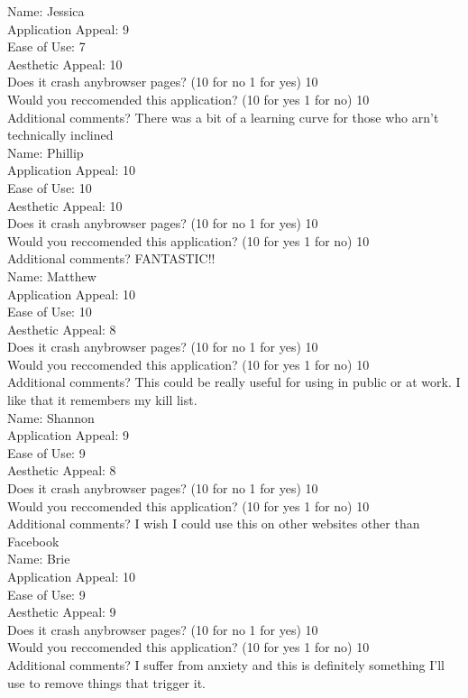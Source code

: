 \documentclass[12pt, titlepage]{article}
\begin{document}
Name: Jessica\\
Application Appeal: 9 \\ 
Ease of Use: 7\\ 
Aesthetic Appeal: 10\\ 
Does it crash anybrowser pages? (10 for no 1 for yes) 10\\ 
Would you reccomended this application? (10 for yes 1 for no) 10\\ 
Additional comments? There was a bit of a learning curve for those who arn't technically inclined\\

Name: Phillip\\
Application Appeal: 10 \\ 
Ease of Use: 10\\ 
Aesthetic Appeal: 10\\ 
Does it crash anybrowser pages? (10 for no 1 for yes) 10\\ 
Would you reccomended this application? (10 for yes 1 for no) 10\\ 
Additional comments? FANTASTIC!!\\

Name: Matthew\\
Application Appeal: 10 \\ 
Ease of Use: 10\\ 
Aesthetic Appeal: 8\\ 
Does it crash anybrowser pages? (10 for no 1 for yes) 10\\ 
Would you reccomended this application? (10 for yes 1 for no) 10\\ 
Additional comments? This could be really useful for using in public or at work. I like that it remembers my kill list.\\

Name: Shannon\\
Application Appeal: 9 \\ 
Ease of Use: 9\\ 
Aesthetic Appeal: 8\\ 
Does it crash anybrowser pages? (10 for no 1 for yes) 10\\ 
Would you reccomended this application? (10 for yes 1 for no) 10\\ 
Additional comments? I wish I could use this on other websites other than Facebook\\


Name: Brie\\
Application Appeal: 10 \\ 
Ease of Use: 9\\ 
Aesthetic Appeal: 9\\ 
Does it crash anybrowser pages? (10 for no 1 for yes) 10\\ 
Would you reccomended this application? (10 for yes 1 for no) 10\\ 
Additional comments? I suffer from anxiety and this is definitely something I'll use to remove things that trigger it.\\
\end{document}
